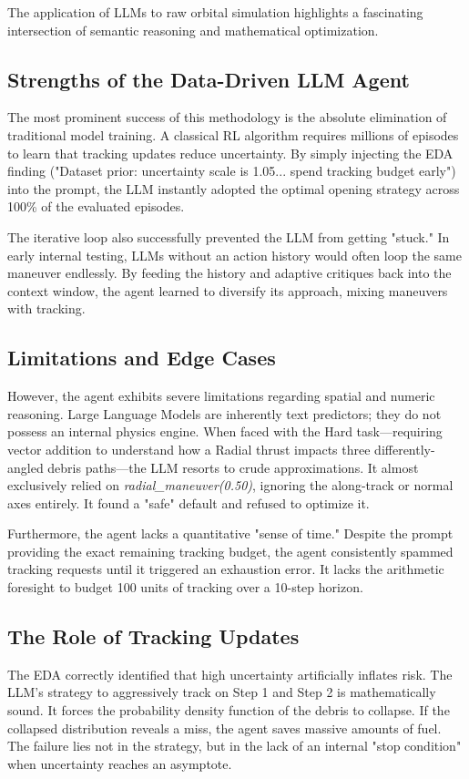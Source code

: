 \documentclass[10pt,journal,compsoc]{IEEEtran}
\begin{document}
The application of LLMs to raw orbital simulation highlights a fascinating intersection of semantic reasoning and mathematical optimization.

\subsection{Strengths of the Data-Driven LLM Agent}
The most prominent success of this methodology is the absolute elimination of traditional model training. A classical RL algorithm requires millions of episodes to learn that tracking updates reduce uncertainty. By simply injecting the EDA finding ("Dataset prior: uncertainty scale is 1.05... spend tracking budget early") into the prompt, the LLM instantly adopted the optimal opening strategy across 100\% of the evaluated episodes. 

The iterative loop also successfully prevented the LLM from getting "stuck." In early internal testing, LLMs without an action history would often loop the same maneuver endlessly. By feeding the history and adaptive critiques back into the context window, the agent learned to diversify its approach, mixing maneuvers with tracking.

\subsection{Limitations and Edge Cases}
However, the agent exhibits severe limitations regarding spatial and numeric reasoning. Large Language Models are inherently text predictors; they do not possess an internal physics engine. When faced with the Hard task—requiring vector addition to understand how a Radial thrust impacts three differently-angled debris paths—the LLM resorts to crude approximations. It almost exclusively relied on \textit{radial\_maneuver(0.50)}, ignoring the along-track or normal axes entirely. It found a "safe" default and refused to optimize it.

Furthermore, the agent lacks a quantitative "sense of time." Despite the prompt providing the exact remaining tracking budget, the agent consistently spammed tracking requests until it triggered an exhaustion error. It lacks the arithmetic foresight to budget 100 units of tracking over a 10-step horizon.

\subsection{The Role of Tracking Updates}
The EDA correctly identified that high uncertainty artificially inflates risk. The LLM's strategy to aggressively track on Step 1 and Step 2 is mathematically sound. It forces the probability density function of the debris to collapse. If the collapsed distribution reveals a miss, the agent saves massive amounts of fuel. The failure lies not in the strategy, but in the lack of an internal "stop condition" when uncertainty reaches an asymptote.
\end{document}

